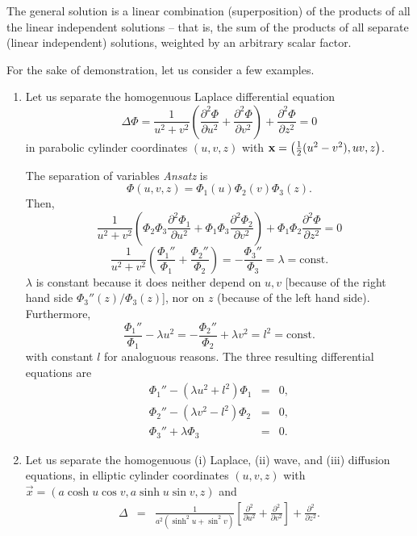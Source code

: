 The general solution
is a linear combination (superposition) of the products of all the linear independent solutions --
that is, the sum of the products of all separate (linear independent) solutions, weighted by an arbitrary scalar factor.

{
\color{blue}
\bexample

For the sake of demonstration, let us consider a few examples.

\begin{enumerate}
\item
Let us separate the homogenuous Laplace differential equation \begin{equation}
\Delta \Phi =\frac{1}{u^2+v^2}
  \left(
    \frac{\partial^2\Phi}{\partial u^2}+
    \frac{\partial^2\Phi}{\partial v^2}
  \right)+
  \frac{\partial^2\Phi}{\partial z^2}
= 0
\end{equation}
in parabolic
cylinder coordinates $(u,v,z)$ with
${\bf x} = \left({1 \over 2} (u^2 - v^2), uv, z\right) $.


The separation of variables {\it Ansatz} is
$$\Phi(u,v,z)=\Phi_1(u)\Phi_2(v)\Phi_3(z).$$
Then,
$$
  \frac{1}{u^2+v^2}
  \left(
    \Phi_2\Phi_3\frac{\partial^2\Phi_1}{\partial u^2}+
    \Phi_1\Phi_3\frac{\partial^2\Phi_2}{\partial v^2}
  \right)+
  \Phi_1\Phi_2\frac{\partial^2\Phi}{\partial z^2}=0
$$
$$
 \frac{1}{u^2+v^2}
  \left(
    \frac{\Phi_1''}{\Phi_1}+
    \frac{\Phi_2''}{\Phi_2}
  \right)=
  -\frac{\Phi_3''}{\Phi_3}=\lambda=\mbox{const.}
$$
$\lambda$ is constant because it does neither depend on $u,v$ [because of the right hand side
$ {\Phi_3'' (z)/\Phi_3 (z)}$],
nor on $z$ (because of the left hand side).
Furthermore,
$$
  \frac{\Phi_1''}{\Phi_1}- \lambda u^2 =
-  \frac{\Phi_2''}{\Phi_2}+   \lambda v^2=l^2=\mbox{const.}
$$
with constant $l$ for analoguous reasons.
The three resulting differential equations are
\begin{eqnarray*}
  \Phi_1''-(\lambda u^2+l^2) \Phi_1 & = & 0, \\
  \Phi_2''-(\lambda v^2-l^2) \Phi_2 & = & 0, \\
  \Phi_3''+\lambda\Phi_3 & = & 0.
\end{eqnarray*}




\item
Let us separate the homogenuous
(i)  Laplace,
(ii) wave,
 and
(iii) diffusion    equations,
in
elliptic cylinder coordinates $(u,v,z)$ with
$\vec x = \left( a \cosh u \cos v, a \sinh u \sin v, z\right)$ and
\begin{eqnarray*}
  \Delta & = &  \frac{1}{a^2(\sinh^2u+\sin^2v)}
    \left[
      \frac{\partial^2}{\partial u^2}+
      \frac{\partial^2}{\partial v^2}
    \right]+\frac{\partial^2}{\partial z^2}.
\end{eqnarray*}


\end{enumerate}}
